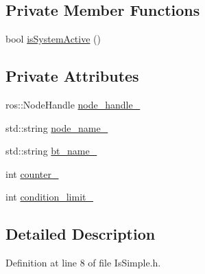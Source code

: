 \subsection*{Private Member Functions}
\begin{DoxyCompactItemize}
\item 
bool \hyperlink{classsarafun_1_1IsSimple_ac90630b4194e090dfe1e93e7f442576c_ac90630b4194e090dfe1e93e7f442576c}{is\-System\-Active} ()
\end{DoxyCompactItemize}
\subsection*{Private Attributes}
\begin{DoxyCompactItemize}
\item 
ros\-::\-Node\-Handle \hyperlink{classsarafun_1_1IsSimple_a461e5f5f34c94f31f81c11ebd5ccbdc3_a461e5f5f34c94f31f81c11ebd5ccbdc3}{node\-\_\-handle\-\_\-}
\item 
std\-::string \hyperlink{classsarafun_1_1IsSimple_a93a14fccdb5329357b784cb6eb71e2e1_a93a14fccdb5329357b784cb6eb71e2e1}{node\-\_\-name\-\_\-}
\item 
std\-::string \hyperlink{classsarafun_1_1IsSimple_a880440b230fe9b00d396905dbe4dfbc6_a880440b230fe9b00d396905dbe4dfbc6}{bt\-\_\-name\-\_\-}
\item 
int \hyperlink{classsarafun_1_1IsSimple_a57504174276eda97908a4e48b3625a97_a57504174276eda97908a4e48b3625a97}{counter\-\_\-}
\item 
int \hyperlink{classsarafun_1_1IsSimple_aa02f0e66054f68dccf7cc78c763c7141_aa02f0e66054f68dccf7cc78c763c7141}{condition\-\_\-limit\-\_\-}
\end{DoxyCompactItemize}


\subsection{Detailed Description}


Definition at line 8 of file Is\-Simple.\-h.



